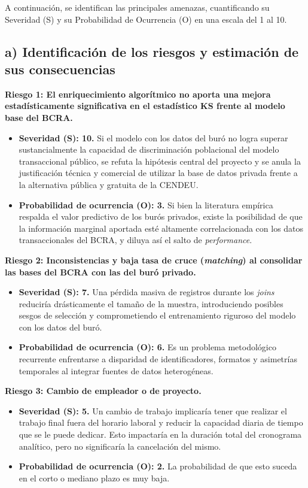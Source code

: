 \documentclass[
11pt, %
]{charter}
\begin{document}
A continuación, se identifican las principales amenazas, cuantificando su Severidad (S) y su Probabilidad de Ocurrencia (O) en una escala del 1 al 10.

\subsection*{a) Identificación de los riesgos y estimación de sus consecuencias}

\textbf{Riesgo 1: El enriquecimiento algorítmico no aporta una mejora estadísticamente significativa en el estadístico KS frente al modelo base del BCRA.}
\begin{itemize}
    \item \textbf{Severidad (S): 10.} Si el modelo con los datos del buró no logra superar sustancialmente la capacidad de discriminación poblacional del modelo transaccional público, se refuta la hipótesis central del proyecto y se anula la justificación técnica y comercial de utilizar la base de datos privada frente a la alternativa pública y gratuita de la CENDEU.
    \item \textbf{Probabilidad de ocurrencia (O): 3.} Si bien la literatura empírica respalda el valor predictivo de los burós privados, existe la posibilidad de que la información marginal aportada esté altamente correlacionada con los datos transaccionales del BCRA, y diluya así el salto de \textit{performance}.
\end{itemize}

\textbf{Riesgo 2: Inconsistencias y baja tasa de cruce (\textit{matching}) al consolidar las bases del BCRA con las del buró privado.}
\begin{itemize}
    \item \textbf{Severidad (S): 7.} Una pérdida masiva de registros durante los \textit{joins} reduciría drásticamente el tamaño de la muestra, introduciendo posibles sesgos de selección y comprometiendo el entrenamiento riguroso del modelo con los datos del buró.
    \item \textbf{Probabilidad de ocurrencia (O): 6.} Es un problema metodológico recurrente enfrentarse a disparidad de identificadores, formatos y asimetrías temporales al integrar fuentes de datos heterogéneas.
\end{itemize}

\textbf{Riesgo 3: Cambio de empleador o de proyecto.}
\begin{itemize}
    \item \textbf{Severidad (S): 5.} Un cambio de trabajo implicaría tener que realizar el trabajo final fuera del horario laboral y reducir la capacidad diaria de tiempo que se le puede dedicar. Esto impactaría en la duración total del cronograma analítico, pero no significaría la cancelación del mismo.
    \item \textbf{Probabilidad de ocurrencia (O): 2.} La probabilidad de que esto suceda en el corto o mediano plazo es muy baja.
\end{itemize}
\end{document}
